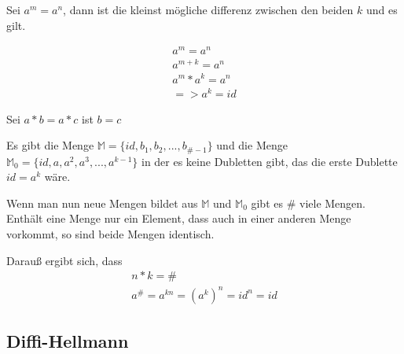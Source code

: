 Sei $a^{m} = a^{n}$, dann ist die kleinst mögliche differenz zwischen den beiden $k$ und es gilt.

\begin{eqnarray}
a^{m} = a^{n} \\
a^{m+k} = a^{n} \\
a^{m} * a^{k} =  a^{n} \\
=> a^{k} = id
\end{eqnarray}

Sei $a * b = a * c$ ist $b = c$

Es gibt die Menge $\mathbb{M} = \{id, b_{1}, b_{2}, ...,  b_{\#-1}\}$ und die Menge $\mathbb{M}_0 = \{ id, a, a^{2}, a^{3}, ... , a^{k-1}\}$ in der es keine Dubletten gibt, das die erste Dublette $id = a^{k}$ wäre.

Wenn man nun neue Mengen bildet aus $\mathbb{M}$ und $\mathbb{M}_{0}$ gibt es $\#$ viele Mengen. Enthält eine Menge nur ein Element, dass auch in einer anderen Menge vorkommt, so sind beide Mengen identisch. 

Darauß ergibt sich, dass
\begin{eqnarray}
n * k = \# \\
a^{\#} = a^{kn} = (a^{k})^{n} = id^{n} = id
\end{eqnarray}


\subsection{Diffi-Hellmann}
\label{sec:hellmann}


